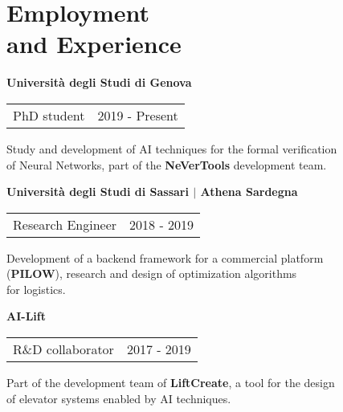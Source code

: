 \section{\sc Employment \\and Experience}
{\bf{Universit\`a degli Studi di Genova}}\\
\begin{tabular}{@{}p{4in}p{2in}}
	PhD student & 2019 - Present\\
\end{tabular}
Study and development of AI techniques for the formal verification\\
of Neural Networks, part of the \textbf{NeVerTools} development team.

{\bf{Universit\`a degli Studi di Sassari $\vert$ Athena Sardegna}}\\
\begin{tabular}{@{}p{4in}p{2in}}
	Research Engineer & 2018 - 2019\\
\end{tabular}
Development of a backend framework for a commercial platform\\
(\textbf{PILOW}), research and design of optimization algorithms\\
for logistics.

{\bf{AI-Lift}}\\
\begin{tabular}{@{}p{4in}p{2in}}
	R\&D collaborator  & 2017 - 2019\\
\end{tabular}
Part of the development team of \textbf{LiftCreate}, a tool for the design\\
of elevator systems enabled by AI techniques.
